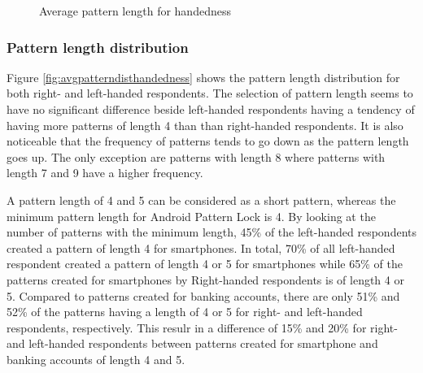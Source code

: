       \begin{figure}[H]
      	\centering
      	\caption{Average pattern length for handedness}
      	\label{fig:avgpatternlengthhandedness}
      \end{figure}

    \subsubsection{Pattern length distribution}
    Figure \ref{fig:avgpatterndisthandedness} shows the pattern length distribution for both right- and left-handed respondents. The selection of pattern length seems to have no significant difference beside left-handed respondents having a tendency of having more patterns of length 4 than than right-handed respondents. It is also noticeable that the frequency of patterns tends to go down as the pattern length goes up. The only exception are patterns with length 8 where patterns with length 7 and 9 have a higher frequency.

    A pattern length of 4 and 5 can be considered as a short pattern, whereas the minimum pattern length for Android Pattern Lock is 4. By looking at the number of patterns with the minimum length, 45\% of the left-handed respondents created a pattern of length 4 for smartphones. In total, 70\% of all left-handed respondent created a pattern of length 4 or 5 for smartphones while 65\% of the patterns created for smartphones by Right-handed respondents is of length 4 or 5. Compared to patterns created for banking accounts, there are only 51\% and 52\% of the patterns having a length of 4 or 5 for right- and left-handed respondents, respectively. This resulr in a difference of 15\% and 20\% for right- and left-handed respondents between patterns created for smartphone and banking accounts of length 4 and 5.

